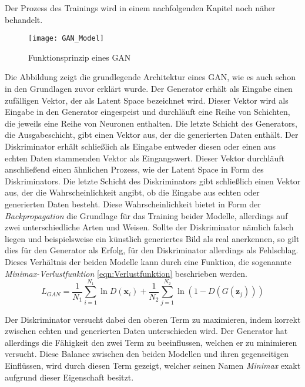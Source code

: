 \noindent Der Prozess des Trainings wird in einem nachfolgenden Kapitel noch näher behandelt. 

\newpage

\begin{figure}[h]
    \centering
    \texttt{[image: GAN\_Model]}
    \caption{Funktionsprinzip eines \ac{GAN}}
    \label{Abb:basic}
    \end{figure}

    \noindent Die Abbildung zeigt die grundlegende Architektur eines \ac{GAN}, wie es auch schon in den Grundlagen zuvor erklärt wurde. Der Generator erhält als Eingabe einen zufälligen Vektor, der als Latent Space bezeichnet wird. Dieser Vektor wird als Eingabe in den Generator eingespeist und durchläuft eine Reihe von Schichten, die jeweils eine Reihe von Neuronen enthalten. Die letzte Schicht des Generators, die Ausgabeschicht, gibt einen Vektor aus, der die generierten Daten enthält. Der Diskriminator erhält schließlich als Eingabe entweder diesen oder einen aus echten Daten stammenden Vektor als Eingangswert. Dieser Vektor durchläuft anschließend einen ähnlichen Prozess, wie der Latent Space in Form des Diskriminators. Die letzte Schicht des Diskriminators gibt schließlich einen Vektor aus, der die Wahrscheinlichkeit angibt, ob die Eingabe aus echten oder generierten Daten besteht. Diese Wahrscheinlichkeit bietet in Form der \textit{Backpropagation} die Grundlage für das Training beider Modelle, allerdings auf zwei unterschiedliche Arten und Weisen. Sollte der Diskriminator nämlich falsch liegen und beispielsweise ein künstlich generiertes Bild als real anerkennen, so gilt dies für den Generator als Erfolg, für den Diskriminator allerdings als Fehlschlag. Dieses Verhältnis der beiden Modelle kann durch eine Funktion, die sogenannte \textit{Minimax-Verlustfunktion} \ref{eqn:Verlustfunktion} beschrieben werden.\\

    \begin{equation}
        \label{eqn:Verlustfunktion}
        L_{GAN}=\frac{1}{N_1}\sum_{i=1}^{N_1} \ln{D (\textbf{x}_i)} + \frac{1}{N_2}\sum_{j=1}^{N_2} \ln{(1-D (G (\textbf{z}_j)))}
        \end{equation}

    \noindent Der Diskriminator versucht dabei den oberen Term zu maximieren, indem korrekt zwischen echten und generierten Daten unterschieden wird. Der Generator hat allerdings die Fähigkeit den zwei Term zu beeinflussen, welchen er zu minimieren versucht. Diese Balance zwischen den beiden Modellen und ihren gegenseitigen Einflüssen, wird durch diesen Term gezeigt, welcher seinen Namen \textit{Minimax} exakt aufgrund dieser Eigenschaft besitzt. \\

